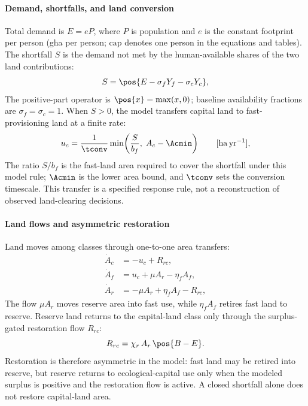 \paragraph{Demand, shortfalls, and land conversion} Total demand is $E=eP$, where $P$ is population and $e$ is the constant footprint per person (gha per person; $\mathrm{cap}$ denotes one person in the equations and tables). The shortfall $S$ is the demand not met by the human-available shares of the two land contributions:
\begin{equation}\label{eq:S}
S=\pos{E-\sigma_f Y_f-\sigma_c Y_c},
\end{equation}
The positive-part operator is $\pos{x}=\max(x,0)$; baseline availability fractions are $\sigma_f=\sigma_c=1$. When $S>0$, the model transfers capital land to fast-provisioning land at a finite rate:
\begin{equation}\label{eq:uc}u_c=\frac{1}{\tconv}\min\!\left(\frac{S}{b_f},\;A_c-\Acmin\right)\qquad[\mathrm{ha\,yr^{-1}}],
\end{equation}
The ratio $S/b_f$ is the fast-land area required to cover the shortfall under this model rule; $\Acmin$ is the lower area bound, and $\tconv$ sets the conversion timescale. This transfer is a specified response rule, not a reconstruction of observed land-clearing decisions.

\paragraph{Land flows and asymmetric restoration} Land moves among classes through one-to-one area transfers:
\begin{align}
\dot A_c&=-u_c+R_{rc},\label{eq:Ac}\\
\dot A_f&=u_c+\mu A_r-\eta_f A_f,\label{eq:Af}\\
\dot A_r&=-\mu A_r+\eta_f A_f-R_{rc},\label{eq:Ar}
\end{align}
The flow $\mu A_r$ moves reserve area into fast use, while $\eta_f A_f$ retires fast land to reserve. Reserve land returns to the capital-land class only through the surplus-gated restoration flow $R_{rc}$:
\begin{equation}\label{eq:Rrc}
R_{rc}=\chi_r\,A_r\,\pos{B-E}.
\end{equation}
Restoration is therefore asymmetric in the model: fast land may be retired into reserve, but reserve returns to ecological-capital use only when the modeled surplus is positive and the restoration flow is active. A closed shortfall alone does not restore capital-land area.

